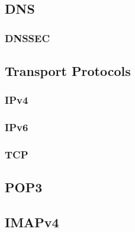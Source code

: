 \subsection{DNS}
\cite{RFC2929}
\subsubsection{DNSSEC}
\cite{RFC5155}

\subsection{Transport Protocols}
\subsubsection{IPv4}
\cite{RFC760}
\cite{RFC791}
\cite{RFC1180}
\cite{RFC792}
\cite{RFC919}
\cite{RFC922}
\cite{RFC950}
\cite[p.~3]{RFC793}

\subsubsection{IPv6}
\cite{RFC2460}

\subsubsection{TCP}

\subsection{POP3}
\cite{RFC1939}

\subsection{IMAPv4}
\cite{RFC3501}

